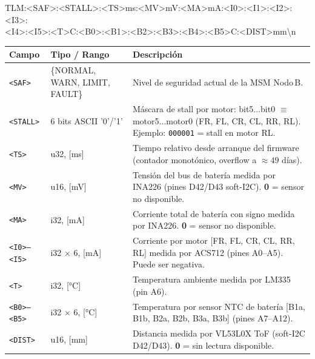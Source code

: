 \begin{center}
\small\ttfamily
TLM:<SAF>:<STALL>:<TS>ms:<MV>mV:<MA>mA:<I0>:<I1>:<I2>:<I3>:\\
\phantom{TLM:}<I4>:<I5>:<T>C:<B0>:<B1>:<B2>:<B3>:<B4>:<B5>C:<DIST>mm\textbackslash n
\end{center}

\begin{center}
\small
\renewcommand{\arraystretch}{1.3}
\begin{tabular}{p{1.8cm}p{3.0cm}p{7.5cm}}
\toprule
\textbf{Campo} & \textbf{Tipo / Rango} & \textbf{Descripción} \\
\midrule
\verb|<SAF>| &
  \{NORMAL, WARN, LIMIT, FAULT\} &
  Nivel de seguridad actual de la MSM Nodo\,B. \\

\verb|<STALL>| &
  6 bits ASCII '0'/'1' &
  Máscara de stall por motor: bit5$\ldots$bit0 $\equiv$ motor5$\ldots$motor0
  (FR, FL, CR, CL, RR, RL). Ejemplo: \verb|000001| = stall en motor RL. \\

\verb|<TS>| &
  u32, [ms] &
  Tiempo relativo desde arranque del firmware (contador monotónico, overflow a $\approx 49$ días). \\

\verb|<MV>| &
  u16, [mV] &
  Tensión del bus de batería medida por INA226 (pines D42/D43 soft-I2C).
  \textbf{0} = sensor no disponible. \\

\verb|<MA>| &
  i32, [mA] &
  Corriente total de batería con signo medida por INA226.
  \textbf{0} = sensor no disponible. \\

\verb|<I0>–<I5>| &
  i32 $\times$ 6, [mA] &
  Corriente por motor [FR, FL, CR, CL, RR, RL] medida por ACS712
  (pines A0–A5). Puede ser negativa. \\

\verb|<T>| &
  i32, [°C] &
  Temperatura ambiente medida por LM335 (pin A6). \\

\verb|<B0>–<B5>| &
  i32 $\times$ 6, [°C] &
  Temperatura por sensor NTC de batería [B1a, B1b, B2a, B2b, B3a, B3b]
  (pines A7–A12). \\

\verb|<DIST>| &
  u16, [mm] &
  Distancia medida por VL53L0X ToF (soft-I2C D42/D43).
  \textbf{0} = sin lectura disponible. \\
\bottomrule
\end{tabular}
\end{center}

